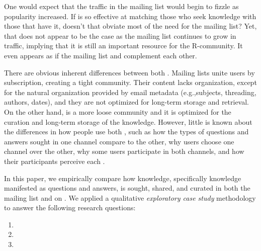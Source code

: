 One would expect that the traffic in the \RH mailing list would begin to fizzle as \SO popularity increased. If \SO is so effective at matching those who seek knowledge with those that have it, doesn't that obviate most of the need for the \RH mailing list? Yet, that does not appear to be the case as the \RH mailing list continues to grow in traffic, implying that it is still an important resource for the R-community. It even appears as if the mailing list and \SO complement each other.

There are obvious inherent differences between both \channels. Mailing lists unite users by subscription, creating a tight community. Their content lacks organization, except for the natural organization provided by email metadata (e.g.,subjects, threading, authors, dates), and they are not optimized for long-term storage and retrieval. On the other hand, \SO is a more loose community and it is optimized for the curation and long-term storage of the knowledge. However, little is known about the differences in how people use both \channels, such as how the types of questions and answers sought in one channel compare to the other, why users choose one channel over the other, why some users participate in both channels, and how their participants perceive each \channel.



In this paper, we empirically compare how knowledge, specifically knowledge manifested as questions and answers, is sought, shared, and curated in both the \RH mailing list and on \SO. We applied a qualitative \textit{exploratory case study} methodology to answer the following research questions:

\begin{enumerate}[label=\bfseries{RQ\arabic*.},itemsep=3pt, topsep=2pt, leftmargin=3em, parsep=0pt]
        \item \rqa
        \item \rqb
        \item \rqc
    \end{enumerate}

